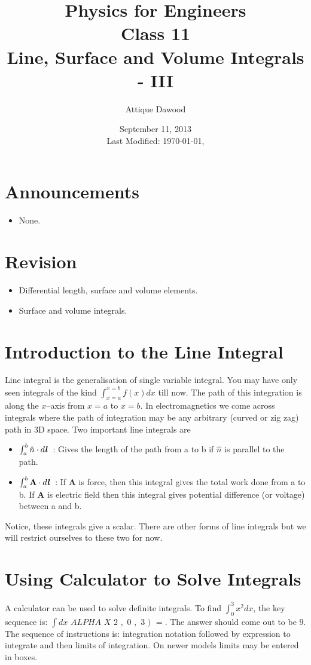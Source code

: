 \documentclass[12pt,a4paper]{article}
\title{\vspace{-2cm}Physics for Engineers\\Class 11\\Line, Surface and Volume Integrals - III}
\author{Attique Dawood}
\date{September 11, 2013\\[0.2cm] Last Modified: \today, \currenttime}
\begin{document}
\maketitle
\section{Announcements}
\begin{itemize}
\item None.
\end{itemize}
\section{Revision}
\begin{itemize}
\item Differential length, surface and volume elements.
\item Surface and volume integrals.
\end{itemize}
\section{Introduction to the Line Integral}
Line integral is the generalisation of single variable integral. You may have only seen integrals of the kind $\int_{x=a}^{x=b} f(x)dx$ till now. The path of this integration is along the $x$--axis from $x=a$ to $x=b$. In electromagnetics we come across integrals where the path of integration may be any arbitrary (curved or zig zag) path in 3D space. Two important line integrals are
\begin{itemize}
\item $\int_{a}^{b}\hat n\cdot d\textbf{\textit{l}}$~: Gives the length of the path from a to b if $\hat n$ is parallel to the path.
\item $\int_{a}^{b}\textbf{A}\cdot d\textbf{\textit{l}}$~: If \textbf{A} is force, then this integral gives the total work done from a to b. If \textbf{A} is electric field then this integral gives potential difference (or voltage) between a and b.
\end{itemize}
Notice, these integrals give a scalar. There are other forms of line integrals but we will restrict ourselves to these two for now.
\section{Using Calculator to Solve Integrals}
A calculator can be used to solve definite integrals. To find $\int_{0}^{3}x^2dx$, the key sequence is: $\boxed{\int dx}$ $\boxed{ALPHA}$ $\boxed{X}$ \fbox{\textasciicircum} $\boxed{2}$ $\boxed{,}$ $\boxed{0}$ $\boxed{,}$ $\boxed{3}$ $\boxed{)}$ $\boxed{=}$. The answer should come out to be 9. The sequence of instructions is: integration notation followed by expression to integrate and then limits of integration. On newer models limits may be entered in boxes.
\end{document}
